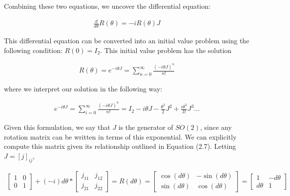\documentclass[10pt]{ucthesis}
\begin{document}
Combining these two equations, we uncover the differential equation:

\begin{equation}
	\begin{aligned}
		\frac{d}{d\theta}R(\theta) = - i R(\theta)J
	\end{aligned}
\end{equation}  

This differential equation can be converted into an initial value problem using the following condition: $R(0) = I_2$. This initial value problem has the solution

\begin{equation}
	\begin{aligned}
		R(\theta) = e^{-i\theta J} = \sum_{n=0}^\infty \frac{(-i\theta J)^n}{n!}
	\end{aligned}
\end{equation}  

\noindent where we interpret our solution in the following way:

\begin{equation}
	\begin{aligned}
		e^{-i\theta J} = \sum_{i=0}^\infty \frac{\left(-i\theta J\right)^n}{n!} = I_2 -i\theta J - \frac{\theta^2}{2} J^2 + \frac{i\theta^3}{3!}J^3 \hdots 
	\end{aligned}
\end{equation}  

Given this formulation, we say that $J$ is the generator of $SO(2)$, since any rotation matrix can be written in terms of this exponential. We can explicitly compute this matrix given its relationship outlined in Equation (2.7). Letting $J = [j]_{ij}$,

\begin{equation}
	\begin{aligned}
		\begin{bmatrix}
			1 & 0 \\
			0 & 1
		\end{bmatrix} + (-i)d\theta * \begin{bmatrix}
			j_{11} & j_{12} \\
			j_{21} & j_{22}
		\end{bmatrix} = R(d\theta) = \begin{bmatrix}
			\cos(d\theta) & -\sin(d\theta) \\
			\sin(d\theta) & \cos(d\theta)
		\end{bmatrix} = 
		\begin{bmatrix}
			1 & -d\theta \\
			d\theta & 1
		\end{bmatrix}
	\end{aligned}
\end{equation}
\end{document}
